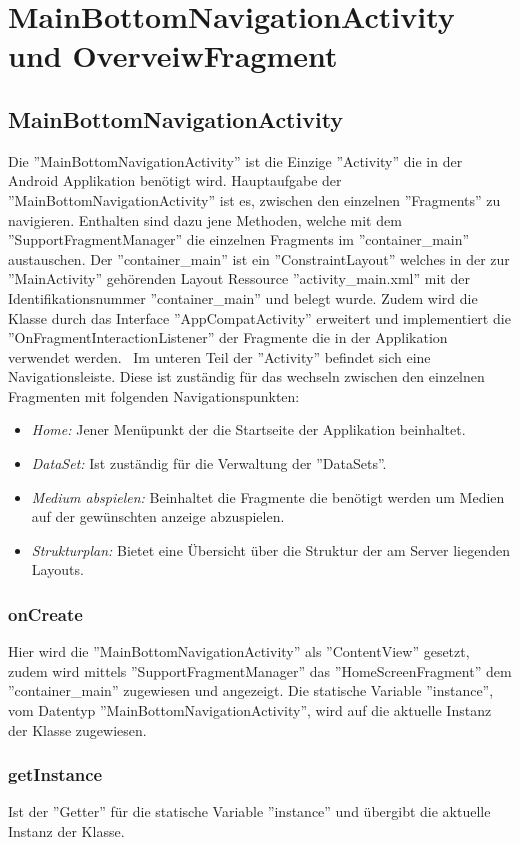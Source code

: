\section{MainBottomNavigationActivity und OverveiwFragment}
\subsection{MainBottomNavigationActivity}
Die ''MainBottomNavigationActivity'' ist die Einzige ''Activity'' die in der Android Applikation benötigt wird. Hauptaufgabe der ''MainBottomNavigationActivity'' ist es, zwischen den einzelnen ''Fragments'' zu navigieren. Enthalten sind dazu jene Methoden, welche mit dem ''SupportFragmentManager'' die einzelnen Fragments im ''container\_main'' austauschen. Der ''container\_main'' ist ein ''ConstraintLayout'' welches in der zur ''MainActivity'' gehörenden Layout Ressource ''activity\_main.xml'' mit der Identifikationsnummer ''container\_main'' und  belegt wurde. Zudem wird die Klasse durch das Interface ''AppCompatActivity'' erweitert und implementiert die ''OnFragmentInteractionListener'' der Fragmente die in der Applikation verwendet werden. 
\
Im unteren Teil der ''Activity'' befindet sich eine Navigationsleiste. Diese ist zuständig für das wechseln zwischen den einzelnen Fragmenten mit folgenden Navigationspunkten: 

\begin{itemize}
	\item {\em Home:} Jener Menüpunkt der die Startseite der Applikation beinhaltet.
	\item {\em DataSet:} Ist zuständig für die Verwaltung der ''DataSets''.
	\item{\em Medium abspielen:} Beinhaltet die Fragmente die benötigt werden um Medien auf der gewünschten anzeige abzuspielen.
	\item {\em Strukturplan:} Bietet eine Übersicht über die Struktur der am Server liegenden Layouts.
\end{itemize}
\subsubsection{onCreate}
Hier wird die ''MainBottomNavigationActivity'' als ''ContentView'' gesetzt, zudem wird mittels ''SupportFragmentManager'' das ''HomeScreenFragment'' dem ''container\_main'' zugewiesen und angezeigt. Die statische Variable ''instance'', vom Datentyp ''MainBottomNavigationActivity'', wird auf die aktuelle Instanz der Klasse zugewiesen. 	
\subsubsection{getInstance}
 Ist der ''Getter'' für die statische Variable ''instance'' und übergibt die aktuelle Instanz der Klasse.
